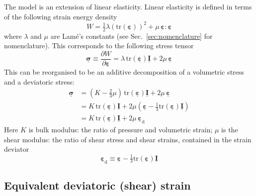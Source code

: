 \documentclass[times,namecite]{goose-article}
\newcommand\T[1]{\underline{\bm{{#1}}}}
\begin{document}
The model is an extension of linear elasticity. Linear elasticity is defined in terms of the following strain energy density
\begin{equation}
\label{eq:energy:elastic}
  W = \tfrac{1}{2} \lambda \left( \text{tr} ( \T{\varepsilon} ) \right)^2 + \mu \, \T{\varepsilon} : \T{\varepsilon}
\end{equation}
where $\lambda$ and $\mu$ are Lam\'{e}'s constants (see Sec.~\ref{sec:nomenclature} for nomenclature). This corresponds to the following stress tensor
\begin{equation}
  \T{\sigma} \equiv \frac{\partial W}{\partial \T{\varepsilon}}
  = \lambda \, \text{tr} ( \T{\varepsilon} ) \T{I} + 2 \mu \, \T{\varepsilon}
\end{equation}
This can be reorganised to be an additive decomposition of a volumetric stress and a deviatoric stress:
\begin{align}
  \T{\sigma}
  &= \left( K - \tfrac{2}{3} \mu \right) \, \text{tr} ( \T{\varepsilon} ) \T{I} + 2 \mu \, \T{\varepsilon}
  \\
  &= K \, \text{tr} ( \T{\varepsilon} ) \T{I} + 2 \mu \left( \T{\varepsilon} - \tfrac{1}{3} \text{tr} ( \T{\varepsilon} ) \T{I} \right)
  \\
  &= K \, \text{tr} ( \T{\varepsilon} ) \T{I} + 2 \mu \, \T{\varepsilon}_\mathrm{d}
\end{align}
Here $K$ is bulk modulus: the ratio of pressure and volumetric strain; $\mu$ is the shear modulus: the ratio of shear stress and shear strains, contained in the strain deviator
\begin{equation}
  \T{\varepsilon}_\mathrm{d} \equiv \T{\varepsilon} - \tfrac{1}{3} \text{tr} ( \T{\varepsilon} ) \T{I}
\end{equation}

\subsection{Equivalent deviatoric (shear) strain}
\end{document}
